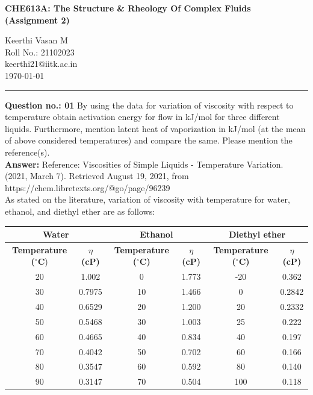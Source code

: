 \documentclass[a4paper,12pt]{report}
\begin{document}
\begin{center}
    \large \textbf{CHE613A: The Structure \& Rheology Of Complex Fluids\\(Assignment 2)}
\end{center}

\begin{flushright}
    Keerthi Vasan M\\Roll No.: 21102023\\keerthi21@iitk.ac.in\\ \today
\end{flushright}
\vspace{-5mm}
\rule{\textwidth}{0.5 pt}
\noindent
\textbf{Question no.: 01} By using the data for variation of viscosity with respect to temperature obtain activation energy for flow in kJ/mol for three different liquids. Furthermore, mention latent heat of vaporization in kJ/mol (at the mean of above considered temperatures) and compare the same. Please mention the reference(s).\\[2mm]
\textbf{Answer:} Reference: Viscosities of Simple Liquids - Temperature Variation. (2021, March 7). Retrieved August 19, 2021, from https://chem.libretexts.org/@go/page/96239\\As stated on the literature, variation of viscosity with temperature for water, ethanol, and diethyl ether are as follows:
    

\begin{table}[H]
\centering

\begin{tabular}{|c|c|c|c|c|c|}
\hline
\multicolumn{2}{|c|}{\textbf{Water}} & \multicolumn{2}{c|}{\textbf{Ethanol}} & \multicolumn{2}{c|}{\textbf{Diethyl ether}} \\ \hline
\textbf{Temperature ($^{\circ}$C})  & \textbf{$\eta$ (cP)}  & \textbf{Temperature ($^{\circ}$C)}   & \textbf{$\eta$ (cP)}  & \textbf{Temperature ($^{\circ}$C)}      & \textbf{$\eta$ (cP)}     \\ \hline
20 & 1.002  & 0  & 1.773 & -20 & 0.362  \\ \hline
30 & 0.7975 & 10 & 1.466 & 0   & 0.2842 \\ \hline
40 & 0.6529 & 20 & 1.200 & 20  & 0.2332 \\ \hline
50 & 0.5468 & 30 & 1.003 & 25  & 0.222  \\ \hline
60 & 0.4665 & 40 & 0.834 & 40  & 0.197  \\ \hline
70 & 0.4042 & 50 & 0.702 & 60  & 0.166  \\ \hline
80 & 0.3547 & 60 & 0.592 & 80  & 0.140  \\ \hline
90 & 0.3147 & 70 & 0.504 & 100 & 0.118  \\ \hline
\end{tabular}%
\end{table}
\end{document}
